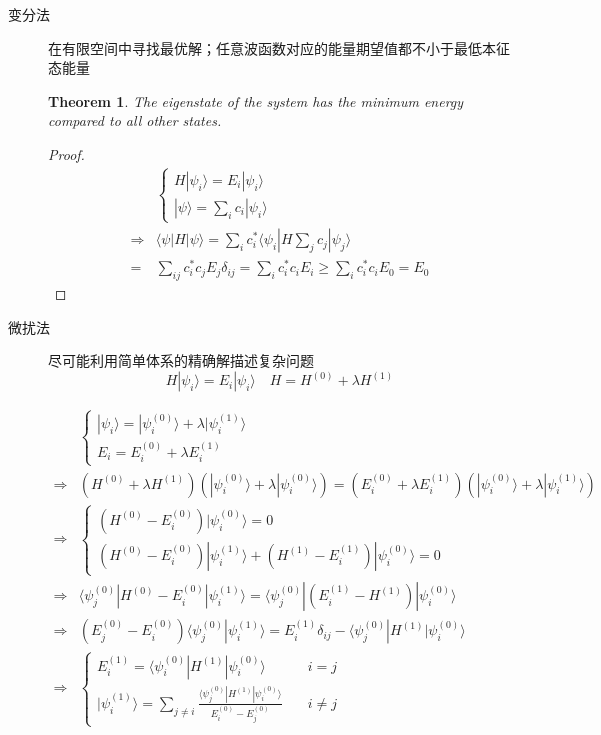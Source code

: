 \documentclass{article}
\newtheorem{theorem}{Theorem}[section]
\newtheorem{proof}{Proof}[section]
\numberwithin{equation}{section}
\newcommand{\ket}[1]{| #1 \rangle}
\newcommand{\bracket}[2]{\langle #1 | #2 \rangle}
\newcommand{\bracketl}[3]{\langle #1 | #2 | #3 \rangle}
\begin{document}
  \begin{description}
	\item[变分法] 在有限空间中寻找最优解；任意波函数对应的能量期望值都不小于最低本征态能量

	\begin{theorem}
	The eigenstate of the system has the minimum energy compared to all other states.
	\end{theorem}

	\begin{proof}
	\begin{align}
	&\begin{cases}
	H\ket{\psi_i} = E_i\ket{\psi_i}\\
	\ket{\psi}=\sum_i c_i \ket{\psi_i}
	\end{cases}\\
	\Rightarrow & \bracketl{\psi}{H}{\psi} = \sum_i c_i^* \bracketl{\psi_i}{H \sum_j c_j}{\psi_j} \\
	=& \sum_{ij}c_i^*c_j E_j \delta_{ij}=\sum_i c_i^* c_i E_i \geq \sum_i c_i^* c_i E_{0}=E_{0}
	\end{align}
	\end{proof}

	\item[微扰法] 尽可能利用简单体系的精确解描述复杂问题
	\begin{equation}
	H\ket{\psi_i}=E_i\ket{\psi_i} \quad H=H^{(0)} +\lambda H^{(1)}
	\end{equation}

	\begin{align*}
	&\begin{cases}
	\ket{\psi_i} = \ket{\psi_i^{(0)}}+\lambda \ket{\psi_i^{(1)}}\\
	E_i=E_i^{(0)} + \lambda E_i^{(1)}
	\end{cases}\\
	\Rightarrow & (H^{(0)}+\lambda H^{(1)})(\ket{\psi^{(0)}_i}+\lambda \ket{\psi_i^{(0)}})=(E_i^{(0)}+\lambda E^{(1)}_i)(\ket{\psi_i^{(0)}}+\lambda \ket{\psi^{(1)}_i}) \\
	\Rightarrow & \begin{cases}
	(H^{(0)}-E_i^{(0)})\ket{\psi_i^{(0)}}=0\\
	(H^{(0)}-E_i^{(0)})\ket{\psi_i^{(1)}}+(H^{(1)}-E_i^{(1)})\ket{\psi_i^{(0)}} =0
	\end{cases}\\
	\Rightarrow & \bracketl{\psi_j^{(0)}}{H^{(0)}-E_i^{(0)}}{\psi_i^{(1)}}=\bracketl{\psi_j^{(0)}}{(E_i^{(1)}-H^{(1)})}{\psi_i^{(0)}}\\
	\Rightarrow & (E_j^{(0)}-E_i^{(0)})\bracket{\psi_j^{(0)}}{\psi_i^{(1)}}=E_i^{(1)}\delta_{ij} -\bracketl{\psi^{(0)}_j}{H^{(1)}}{\psi_i^{(0)}}\\
	\Rightarrow &
	\begin{cases}
	E_i^{(1)}=\bracketl{\psi_i^{(0)}}{H^{(1)}}{\psi_i^{(0)}} &\quad i=j \\
	\ket{\psi_i^{(1)}}=\sum_{j\neq i}\frac{\bracketl{\psi^{(0)}_j}{H^{(1)}}{\psi^{(0)}_i}}{E^{(0)}_i-E^{(0)}_j} &\quad i\neq j
	\end{cases}
	\end{align*}


\end{description}
\end{document}
